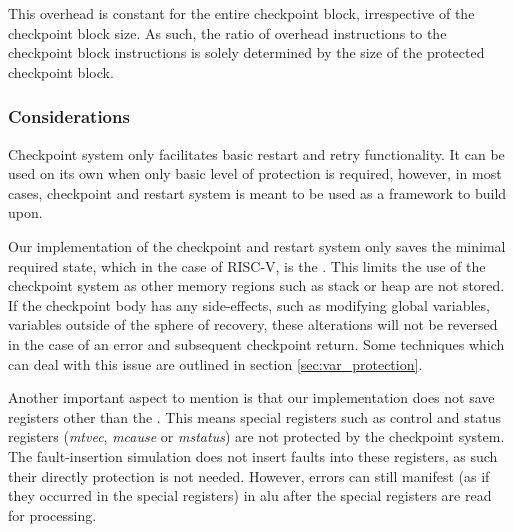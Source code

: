 This overhead is constant for the entire checkpoint block, irrespective of the checkpoint block size. As such, the ratio of overhead instructions to the checkpoint block instructions is solely determined by the size of the protected checkpoint block.

\subsubsection{Considerations} \label{sec:checkpoint_considerations}

Checkpoint system only facilitates basic restart and retry functionality. It can be used on its own when only basic level of protection is required, however, in most cases, checkpoint and restart system is meant to be used as a framework to build upon.

Our implementation of the checkpoint and restart system only saves the minimal required state, which in the case of RISC-V, is the . This limits the use of the checkpoint system as other memory regions such as stack or heap are not stored. If the checkpoint body has any side-effects, such as modifying global variables, variables outside of the sphere of recovery, these alterations will not be reversed in the case of an error and subsequent checkpoint return. Some techniques which can deal with this issue are outlined in section \ref{sec:var_protection}.

Another important aspect to mention is that our implementation does not save registers other than the . This means special registers such as control and status registers (\textit{mtvec}, \textit{mcause} or \textit{mstatus}) are not protected by the checkpoint system. The fault-insertion simulation does not insert faults into these registers, as such their directly protection is not needed. However, errors can still manifest (as if they occurred in the special registers) in \acrshort{alu} after the special registers are read for processing.
